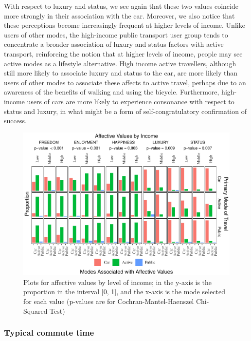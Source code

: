 \documentclass[]{elsarticle} %
\makeatletter
\def\maxwidth{\ifdim\Gin@nat@width>\linewidth\linewidth
\else\Gin@nat@width\fi}
\let\Oldincludegraphics\includegraphics
\renewcommand{\includegraphics}[1]{\Oldincludegraphics[width=\maxwidth]{#1}}
\makeatother
\begin{document}
With respect to luxury and status, we see again that these two values
coincide more strongly in their association with the car. Moreover, we
also notice that these perceptions become increasingly frequent at
higher levels of income. Unlike users of other modes, the high-income
public transport user group tends to concentrate a broader association
of luxury and status factors with active transport, reinforcing the
notion that at higher levels of income, people may see active modes as a
lifestyle alternative. High income active travellers, although still
more likely to associate luxury and status to the car, are more likely
than users of other modes to associate these affects to active travel,
perhaps due to an awareness of the benefits of walking and using the
bicycle. Furthermore, high-income users of cars are more likely to
experience consonance with respect to status and luxury, in what might
be a form of self-congratulatory confirmation of success.

\begin{figure}
\centering
\includegraphics{Dissonance_Santiago_v2_files/figure-latex/figure-bar-plots-by-attribute-and-income-1.pdf}
\caption{\label{fig:bar-plots-by-income}Plots for affective values by
level of income; in the y-axis is the proportion in the interval {[}0,
1{]}, and the x-axis is the mode selected for each value (p-values are
for Cochran-Mantel-Haenszel Chi-Squared Test)}
\end{figure}

\hypertarget{typical-commute-time-1}{%
\subsubsection{Typical commute time}\label{typical-commute-time-1}}
\end{document}
